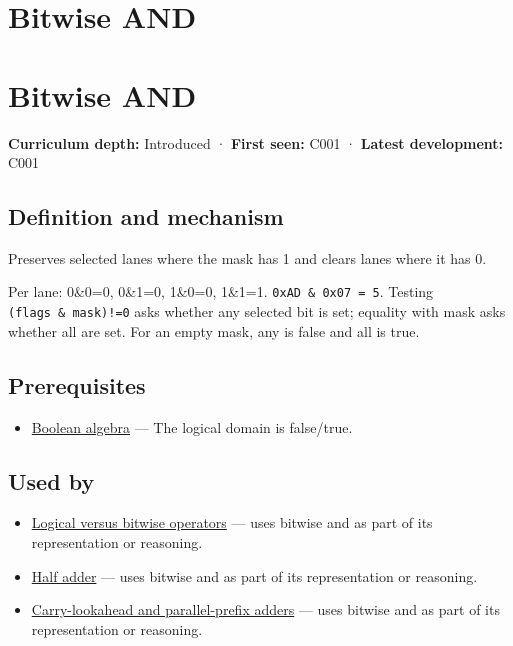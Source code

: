 \hypertarget{appendix-68b52453737c}{}
\section*{Bitwise AND}
\section{Bitwise AND}\label{appendix-68b52453737c-bitwise-and}

\textbf{Curriculum depth:} Introduced · \textbf{First seen:} C001 · \textbf{Latest development:} C001

\subsection{Definition and mechanism}\label{appendix-68b52453737c-definition-and-mechanism}

Preserves selected lanes where the mask has 1 and clears lanes where it has 0.

Per lane: 0\&0=0, 0\&1=0, 1\&0=0, 1\&1=1. \texttt{0xAD\ \&\ 0x07\ =\ 5}. Testing \texttt{(flags\ \&\ mask)!=0} asks whether any selected bit is set; equality with mask asks whether all are set. For an empty mask, any is false and all is true.

\subsection{Prerequisites}\label{appendix-68b52453737c-prerequisites}

\begin{itemize}
\tightlist
\item
  \hyperref[appendix-24475e1596a8]{Boolean algebra} --- The logical domain is false/true.
\end{itemize}

\subsection{Used by}\label{appendix-68b52453737c-used-by}

\begin{itemize}
\tightlist
\item
  \hyperref[appendix-fe6b457d68d8]{Logical versus bitwise operators} --- uses bitwise and as part of its representation or reasoning.
\item
  \hyperref[appendix-1652d27a8e90]{Half adder} --- uses bitwise and as part of its representation or reasoning.
\item
  \hyperref[appendix-b5c46b2d94ff]{Carry-lookahead and parallel-prefix adders} --- uses bitwise and as part of its representation or reasoning.
\end{itemize}

